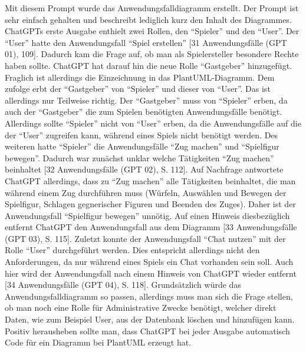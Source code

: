 Mit diesem Prompt wurde das Anwendungsfalldiagramm erstellt. Der Prompt ist sehr einfach gehalten und beschreibt lediglich kurz den Inhalt des Diagrammes.\\

ChatGPTs erste Ausgabe enthielt zwei Rollen, den ``Spieler'' und den ``User''. Der ``User'' hatte den Anwendungsfall ``Spiel erstellen'' 
[31 Anwendungsfälle (GPT 01), 109]. Dadurch kam die 
Frage auf, ob man als Spielersteller besondere Rechte haben sollte. ChatGPT hat darauf hin die neue Rolle ``Gastgeber'' hinzugefügt. Fraglich ist allerdings
die Einzeichnung in das PlantUML-Diagramm. Dem zufolge erbt der ``Gastgeber'' von ``Spieler'' und dieser von ``User''. Das ist allerdings nur Teilweise richtig.
Der ``Gastgeber'' muss von ``Spieler'' erben, da auch der ``Gastgeber'' die zum Spielen benötigten Anwendungsfälle benötigt. Allerdings sollte ``Spieler'' nicht 
von ``User'' erben, da die Anwendungsfälle auf die der ``User'' zugreifen kann, während eines Spiels nicht benötigt werden. Des weiteren hatte ``Spieler'' die 
Anwendungsfälle ``Zug machen'' und ``Spielfigur bewegen''. Dadurch war zunächst unklar welche Tätigkeiten ``Zug machen'' beinhaltet 
[32 Anwendungsfälle (GPT 02), S. 112]. Auf Nachfrage antwortete 
ChatGPT allerdings, dass zu ``Zug machen'' alle Tätigkeiten beinhaltet, die man während einem Zug durchführen muss (Würfeln, Auswählen und Bewegen der Spielfigur, 
Schlagen gegnerischer Figuren und Beenden des Zuges). Daher ist der Anwendungsfall ``Spielfigur bewegen'' unnötig. Auf einen Hinweis diesbezüglich entfernt ChatGPT 
den Anwendungsfall aus dem Diagramm [33 Anwendungsfälle (GPT 03), S. 115]. Zuletzt konnte der Anwendungsfall ``Chat nutzen'' mit der Rolle 
``User'' durchgeführt werden. Dies entspricht allerdings nicht 
den Anforderungen, da nur während eines Spiels ein Chat vorhanden sein soll. Auch hier wird der Anwendungsfall nach einem Hinweis von ChatGPT wieder entfernt 
[34 Anwendungsfälle (GPT 04), S. 118]. 
Grundsätzlich würde das Anwendungsfalldiagramm so passen, allerdings muss man sich die Frage stellen, ob man noch eine Rolle für Administrative Zwecke benötigt, 
welcher direkt Daten, wie zum Beispiel User, aus der Datenbank löschen und hinzufügen kann. Positiv herausheben sollte man, dass ChatGPT bei jeder Ausgabe 
automatisch Code für ein Diagramm bei PlantUML erzeugt hat.\\

